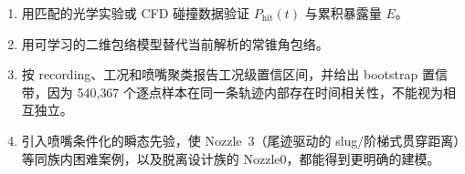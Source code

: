 \begin{enumerate}
  \item 用匹配的光学实验或 CFD 碰撞数据验证 $P_{\mathrm{hit}}(t)$ 与累积暴露量 $E$。
  \item 用可学习的二维包络模型替代当前解析的常锥角包络。
  \item 按 recording、工况和喷嘴聚类报告工况级置信区间，并给出 bootstrap 置信带，因为 540{,}367 个逐点样本在同一条轨迹内部存在时间相关性，不能视为相互独立。
  \item 引入喷嘴条件化的瞬态先验，使 Nozzle~3（尾迹驱动的 slug/阶梯式贯穿距离）等同族内困难案例，以及脱离设计族的 Nozzle0，都能得到更明确的建模。
\end{enumerate}

\clearpage
